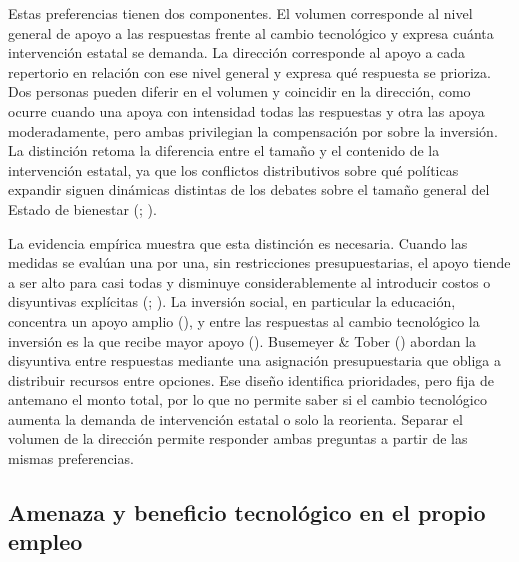 \documentclass[
  spanish,
  12pt,
]{article}
\begin{document}
Estas preferencias tienen dos componentes. El volumen corresponde al
nivel general de apoyo a las respuestas frente al cambio tecnológico y
expresa cuánta intervención estatal se demanda. La dirección corresponde
al apoyo a cada repertorio en relación con ese nivel general y expresa
qué respuesta se prioriza. Dos personas pueden diferir en el volumen y
coincidir en la dirección, como ocurre cuando una apoya con intensidad
todas las respuestas y otra las apoya moderadamente, pero ambas
privilegian la compensación por sobre la inversión. La distinción retoma
la diferencia entre el tamaño y el contenido de la intervención estatal,
ya que los conflictos distributivos sobre qué políticas expandir siguen
dinámicas distintas de los debates sobre el tamaño general del Estado de
bienestar (; ).

La evidencia empírica muestra que esta distinción es necesaria. Cuando
las medidas se evalúan una por una, sin restricciones presupuestarias,
el apoyo tiende a ser alto para casi todas y disminuye considerablemente
al introducir costos o disyuntivas explícitas
(;
). La
inversión social, en particular la educación, concentra un apoyo amplio
(),
y entre las respuestas al cambio tecnológico la inversión es la que
recibe mayor apoyo (). Busemeyer \& Tober
() abordan la disyuntiva
entre respuestas mediante una asignación presupuestaria que obliga a
distribuir recursos entre opciones. Ese diseño identifica prioridades,
pero fija de antemano el monto total, por lo que no permite saber si el
cambio tecnológico aumenta la demanda de intervención estatal o solo la
reorienta. Separar el volumen de la dirección permite responder ambas
preguntas a partir de las mismas preferencias.

\subsection{Amenaza y beneficio tecnológico en el propio
empleo}\label{amenaza-y-beneficio-tecnoluxf3gico-en-el-propio-empleo}
\end{document}
